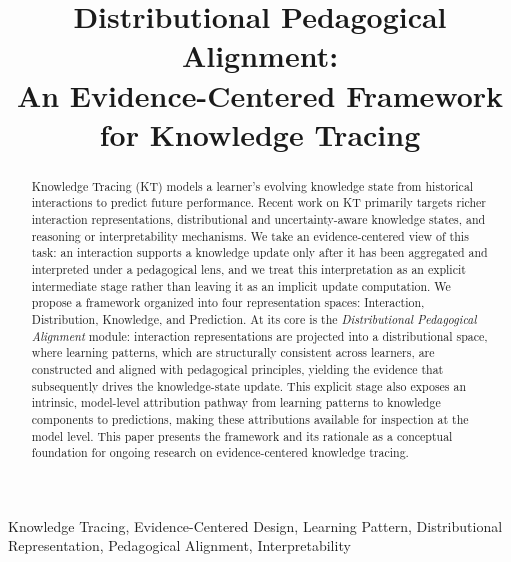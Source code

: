 \documentclass[conference]{IEEEtran}
\begin{document}
\title{Distributional Pedagogical Alignment:\\An Evidence-Centered Framework for Knowledge Tracing}

\author{%
\and
{}
}

\maketitle

\begin{abstract}
Knowledge Tracing (KT) models a learner's evolving knowledge state from historical interactions to predict future performance. Recent work on KT primarily targets richer interaction representations, distributional and uncertainty-aware knowledge states, and reasoning or interpretability mechanisms. We take an evidence-centered view of this task: an interaction supports a knowledge update only after it has been aggregated and interpreted under a pedagogical lens, and we treat this interpretation as an explicit intermediate stage rather than leaving it as an implicit update computation. We propose a framework organized into four representation spaces: Interaction, Distribution, Knowledge, and Prediction. At its core is the \emph{Distributional Pedagogical Alignment} module: interaction representations are projected into a distributional space, where learning patterns, which are structurally consistent across learners, are constructed and aligned with pedagogical principles, yielding the evidence that subsequently drives the knowledge-state update. This explicit stage also exposes an intrinsic, model-level attribution pathway from learning patterns to knowledge components to predictions, making these attributions available for inspection at the model level. This paper presents the framework and its rationale as a conceptual foundation for ongoing research on evidence-centered knowledge tracing.
\end{abstract}

\begin{IEEEkeywords}
Knowledge Tracing, Evidence-Centered Design, Learning Pattern, Distributional Representation, Pedagogical Alignment, Interpretability
\end{IEEEkeywords}
\end{document}
